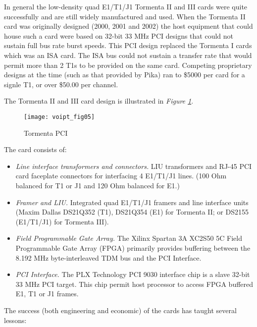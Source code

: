 \documentclass[letterpaper,final,notitlepage,twocolumn,10pt,twoside]{article}
\begin{document}
In general the low-density quad E1/T1/J1 Tormenta II and III cards were quite
successfully and are still widely manufactured and used.  When the Tormenta II
card was originally designed (2000, 2001 and 2002) the host equipment that could
house such a card were based on 32-bit 33 MHz PCI designs that could not sustain
full bus rate burst speeds.  This PCI design replaced the Tormenta I cards which
was an ISA card.  The ISA bus could not sustain a transfer rate that would
permit more than 2 T1s to be provided on the same card.  Competing proprietary
designs at the time (such as that provided by Pika) ran to \$5000 per card for a
signle T1, or over \$50.00 per channel.

The Tormenta II and III card design is illustrated in \textsl{Figure
\ref{figure:voipt_fig05}}.
\begin{figure}[htp]
\center\texttt{[image: voipt\_fig05]}
\caption[Tormenta]{Tormenta PCI}
\label{figure:voipt_fig05}
\end{figure}
The card consists of:

\begin{itemize}
	\item \textsl{Line interface transformers and connectors.}
		LIU transformers and RJ-45 PCI card faceplate connectors for
		interfacing 4 E1/T1/J1 lines. (100 Ohm balanced for T1 or J1 and
		120 Ohm balanced for E1.)
	\item \textsl{Framer and LIU.}
		Integrated quad E1/T1/J1 framers and line interface units
		(Maxim Dallas DS21Q352 (T1), DS21Q354 (E1) for Tormenta II; or
		DS2155 (E1/T1/J1) for Tormenta III).
	\item \textsl{Field Programmable Gate Array.}
		The Xilinx Spartan 3A XC2S50 5C Field Programmable Gate Array
		(FPGA) primarily provides buffering between the 8.192 MHz
		byte-interleaved TDM bus and the PCI Interface.
	\item \textsl{PCI Interface.}
		The PLX Technology PCI 9030 interface chip is a slave 32-bit 33
		MHz PCI target.  This chip permit host processor to access FPGA
		buffered E1, T1 or J1 frames.
\end{itemize}

The success (both engineering and economic) of the cards has taught several
lessons:
\end{document}
